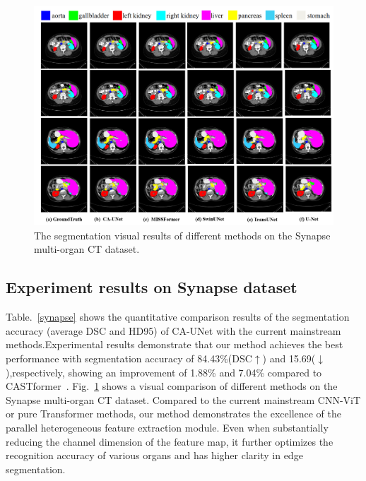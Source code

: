 \begin{figure}[t!]
\includegraphics[width=\textwidth]{images/visulisation.png}
\caption{The segmentation visual results of different methods on the Synapse multi-organ CT dataset.}\label{segmentation}
\end{figure}



\subsection{Experiment results on Synapse dataset}

Table.~\ref{synapse} shows the quantitative comparison results of the segmentation accuracy (average DSC and HD95) of CA-UNet with the current mainstream methods.Experimental results demonstrate that our method achieves the best performance with segmentation accuracy of 84.43\%(DSC$\uparrow$) and 15.69($\downarrow$),respectively, showing an improvement of 1.88\% and 7.04\% compared to CASTformer~\cite{huang2022missformer}. Fig.~\ref{segmentation} shows a visual comparison of different methods on the Synapse multi-organ CT dataset. Compared to the current mainstream CNN-ViT or pure Transformer methods, our method demonstrates the excellence of the parallel heterogeneous feature extraction module. Even when substantially reducing the channel dimension of the feature map, it further optimizes the recognition accuracy of various organs and has higher clarity in edge segmentation.

